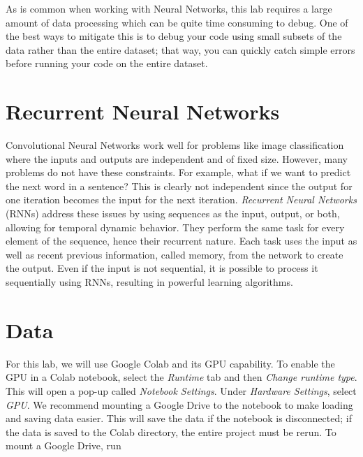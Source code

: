 
\begin{warn}
    As is common when working with Neural Networks, this lab requires a large amount of data processing which can be quite time consuming to debug.
    One of the best ways to mitigate this is to debug your code using small subsets of the data rather than the entire dataset; that way, you can quickly catch simple errors before running your code on the entire dataset.
\end{warn}

\section*{Recurrent Neural Networks}

Convolutional Neural Networks work well for problems like image classification where the inputs and outputs are independent and of fixed size.
However, many problems do not have these constraints.
For example, what if we want to predict the next word in a sentence?
This is clearly not independent since the output for one iteration becomes the input for the next iteration. %
\emph{Recurrent Neural Networks} (RNNs) address these issues by using sequences as the input, output, or both, allowing for temporal dynamic behavior.
They perform the same task for every element of the sequence, hence their recurrent nature.
Each task uses the input as well as recent previous information, called memory, from the network to create the output.
Even if the input is not sequential, it is possible to process it sequentially using RNNs, resulting in powerful learning algorithms.


\section*{Data}

For this lab, we will use Google Colab and its GPU capability.
To enable the GPU in a Colab notebook, select the \emph{Runtime} tab and then \emph{Change runtime type}.
This will open a pop-up called \emph{Notebook Settings}. Under \emph{Hardware Settings}, select \emph{GPU}.
We recommend mounting a Google Drive to the notebook to make loading and saving data easier.
This will save the data if the notebook is disconnected; if the data is saved to the Colab directory, the entire project must be rerun.
To mount a Google Drive, run


